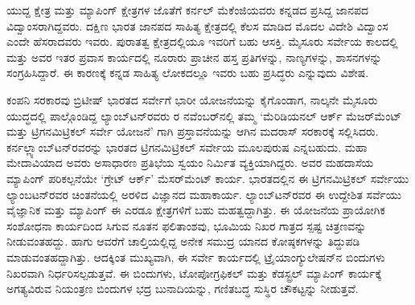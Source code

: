 ಯುದ್ದ ಕ್ಷೇತ್ರ ಮತ್ತು ಮ್ಯಾಪಿಂಗ್​ ಕ್ಷೇತ್ರಗಳ ಜೊತೆಗೆ ಕರ್ನಲ್​ ಮೆಕೆಂಜಿಯವರು ಕನ್ನಡದ ಪ್ರಸಿದ್ದ ಜಾನಪದ ವಿದ್ವಾಂಸರಾಗಿದ್ದವರು. ದಕ್ಷಿಣ ಭಾರತ ಜಾನಪದ ಸಾಹಿತ್ಯ ಕ್ಷೇತ್ರದಲ್ಲಿ ಕೆಲಸ ಮಾಡಿದ ಮೊದಲ ವಿದೇಶಿ ವಿದ್ವಾಂಸ ಎಂದೇ ಹೆಸರಾದವರು ಇವರು. ಪುರಾತತ್ವ ಕ್ಷೇತ್ರದಲ್ಲಿಯೂ ಇವರಿಗೆ ಬಹು ಆಸಕ್ತಿ. ಮೈಸೂರು ಸರ್ವೇಯ ಕಾಲದಲ್ಲಿ ಮತ್ತು ಅವರ ಇತರ ಪ್ರವಾಸ ಕಾರ್ಯದಲ್ಲಿ ನೂರಾರು ಪ್ರಾಚೀನ ಹಸ್ತ ಪ್ರತಿಗಳನ್ನು, ನಾಣ್ಯಗಳನ್ನು, ಶಾಸನಗಳನ್ನು ಸಂಗ್ರಹಿಸಿದ್ದಾರೆ. ಈ ಕಾರಣಕ್ಕೆ ಕನ್ನಡ ಸಾಹಿತ್ಯ ಲೋಕದಲ್ಲೂ ಇವರು ಬಹು ಪ್ರಸಿದ್ಧರು ಎನ್ನುವುದು ವಿಶೇಷ.

ಕಂಪನಿ ಸರಕಾರವು ಬ್ರಿಟೀಷ್​ ಭಾರತದ ಸರ್ವೇಗೆ ಭಾರೀ ಯೋಜನೆಯನ್ನು ಕೈಗೊಂಡಾಗ, ನಾಲ್ಕನೇ ಮೈಸೂರು ಯುದ್ಧದಲ್ಲಿ ಪಾಲ್ಗೊಂಡಿದ್ದ ಲ್ಯಾಂಬ್​ಟನ್​ರವರು ರ ನವೆಂಬರ್​\break ನಲ್ಲಿ ತಮ್ಮ ‘ಮೆರಿಡಿಯನಲ್​ ಆರ್ಕ್ ಮೆಜರ್​ಮೆಂಟ್​ ಮತ್ತು ಟ್ರಿಗನಮಿಟ್ರಿಕಲ್​ ಸರ್ವೇ ಯೋಜನೆ’ ಗಾಗಿ ಪ್ರಸ್ತಾವನೆಯನ್ನು ಆಗಿನ ಮದರಾಸ್​ ಸರಕಾರಕ್ಕೆ ಸಲ್ಲಿಸಿದರು. ಕರ್ನಲ್\break ಲ್ಯಾಂಬ್​ಟನ್​ರವರನ್ನು ಭಾರತದ ಟ್ರಿಗನಮಿಟ್ರಿಕಲ್​ ಸರ್ವೇಯ ಮೂಲಪುರುಷ ಎನ್ನಬಹುದು. ಮಹಾ ಮೇದಾವಿಯಾದ ಅವರು ಅಸಾಧಾರಣ ಪ್ರತಿಭೆಯ ಸ್ವಯಂ ನಿರ್ಮಿತ ವ್ಯಕ್ತಿಯಾಗಿದ್ದರು. ಅವರ ಮಹದಾಸೆಯ ಮ್ಯಾಪಿಂಗ್​ ಪರಿಕಲ್ಪನೆಯೇ ‘ಗ್ರೇಟ್​ ಆರ್ಕ್’ ಮೆಸರ್​\break ಮೆಂಟ್​ ಕಾರ್ಯ. ಭಾರತದಲ್ಲಿನ ಈ ಟ್ರಿಗನಮಿಟ್ರಿಕಲ್​ ಸರ್ವೇಯು ಲ್ಯಾಂಬಟನ್​ರವರ ಚಿಂತನೆಯಲ್ಲಿ ಅರಳಿದ ವಿಜ್ಞಾನದ ಮಹಾಕಾರ್ಯ. ಲ್ಯಾಂಬ್​ಟನ್​ರವರ ಈ ಉದ್ದೇಶಿತ ಸರ್ವೆಯು ವೈಜ್ಞಾನಿಕ ಮತ್ತು ಮ್ಯಾಪಿಂಗ್​ ಈ ಎರಡೂ ಕ್ಷೇತ್ರಗಳಿಗೆ ಬಹು ಮಹತ್ವದ್ದಾಗಿತ್ತು. ಈ ಯೋಜನೆಯ ಪ್ರಾಯೋಗಿಕ ಸಂಶೋಧನಾ ಕಾರ್ಯದಿಂದ ಸಿಗುವ ನೂತನ ಫಲಿತಾಂಶವು, ಭೂಮಿಯ ನಿಖರ ಗಾತ್ರದ ಸ್ಪಷ್ಟ ಚಿತ್ರಣವನ್ನು ನೀಡುವಂತಹದ್ದು. ಹಾಗು ಆವರೆಗೆ ಚಾಲ್ತಿಯಲ್ಲಿದ್ದ ಅನೇಕ ಸಮುದ್ರ ಯಾನದ ಕೋಷ್ಠಕಗಳನ್ನು ತಿದ್ದುಪಡಿ ಮಾಡುವಂತಹದ್ದಾಗಿತ್ತು. ಆದಕ್ಕಿಂತ ಮುಖ್ಯವಾಗಿ, ಈ ಸರ್ವೇ ಕಾರ್ಯದಲ್ಲಿ ಟ್ರೈಯಾಂಗ್ಯುಲೇಷನ್​ನ ಬಿಂದುಗಳು ನಿಖರವಾಗಿ ನಿರ್ಧರಿಸಲ್ಪಡುತ್ತವೆ. ಈ ಬಿಂದುಗಳು, ಟೋಪೋಗ್ರಫಿಕಲ್​ ಮತ್ತು ಕೆಡಸ್ಟ್ರಲ್​ ಮ್ಯಾಪಿಂಗ್​ ಕಾರ್ಯಕ್ಕೆ ಅಗತ್ಯವಿರುವ ನಿಯಂತ್ರಣ ಬಿಂದುಗಳ ಭದ್ರ ಬುನಾದಿಯನ್ನು, ಗಣಿತಬದ್ಧ ಸುಸ್ಥಿರ ಚೌಕಟ್ಟನ್ನು ನೀಡುತ್ತವೆ.

